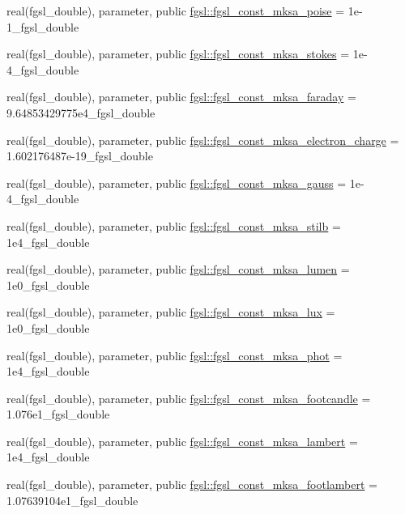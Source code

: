 \begin{DoxyCompactItemize}
\item 
real(fgsl\+\_\+double), parameter, public \hyperlink{namespacefgsl_a1b18b9e73da6e94185746f50a31ca4c3}{fgsl\+::fgsl\+\_\+const\+\_\+mksa\+\_\+poise} = 1e-\/1\+\_\+fgsl\+\_\+double
\item 
real(fgsl\+\_\+double), parameter, public \hyperlink{namespacefgsl_a273648685fb01a8fa87760688d2be8aa}{fgsl\+::fgsl\+\_\+const\+\_\+mksa\+\_\+stokes} = 1e-\/4\+\_\+fgsl\+\_\+double
\item 
real(fgsl\+\_\+double), parameter, public \hyperlink{namespacefgsl_a7a5c5ad37eb790e7372f127324e5fc9f}{fgsl\+::fgsl\+\_\+const\+\_\+mksa\+\_\+faraday} = 9.\+64853429775e4\+\_\+fgsl\+\_\+double
\item 
real(fgsl\+\_\+double), parameter, public \hyperlink{namespacefgsl_a5e5f274ebbe5764c7828f792b8b10b12}{fgsl\+::fgsl\+\_\+const\+\_\+mksa\+\_\+electron\+\_\+charge} = 1.\+602176487e-\/19\+\_\+fgsl\+\_\+double
\item 
real(fgsl\+\_\+double), parameter, public \hyperlink{namespacefgsl_a043539089f28355888955c6546349052}{fgsl\+::fgsl\+\_\+const\+\_\+mksa\+\_\+gauss} = 1e-\/4\+\_\+fgsl\+\_\+double
\item 
real(fgsl\+\_\+double), parameter, public \hyperlink{namespacefgsl_a744ee71f71c6df7add4526f13316e982}{fgsl\+::fgsl\+\_\+const\+\_\+mksa\+\_\+stilb} = 1e4\+\_\+fgsl\+\_\+double
\item 
real(fgsl\+\_\+double), parameter, public \hyperlink{namespacefgsl_a7bb4dd075b4ec4613ff976153a8a42dd}{fgsl\+::fgsl\+\_\+const\+\_\+mksa\+\_\+lumen} = 1e0\+\_\+fgsl\+\_\+double
\item 
real(fgsl\+\_\+double), parameter, public \hyperlink{namespacefgsl_a38e1e1db82aff58851133f55d981feed}{fgsl\+::fgsl\+\_\+const\+\_\+mksa\+\_\+lux} = 1e0\+\_\+fgsl\+\_\+double
\item 
real(fgsl\+\_\+double), parameter, public \hyperlink{namespacefgsl_aa7384fc174d5954073075ac6e8117789}{fgsl\+::fgsl\+\_\+const\+\_\+mksa\+\_\+phot} = 1e4\+\_\+fgsl\+\_\+double
\item 
real(fgsl\+\_\+double), parameter, public \hyperlink{namespacefgsl_aed42c585eae8fbc1ddd6baf9d539408f}{fgsl\+::fgsl\+\_\+const\+\_\+mksa\+\_\+footcandle} = 1.\+076e1\+\_\+fgsl\+\_\+double
\item 
real(fgsl\+\_\+double), parameter, public \hyperlink{namespacefgsl_abb530767690eea1cf7e8d6d99141ae41}{fgsl\+::fgsl\+\_\+const\+\_\+mksa\+\_\+lambert} = 1e4\+\_\+fgsl\+\_\+double
\item 
real(fgsl\+\_\+double), parameter, public \hyperlink{namespacefgsl_a5362c5c67d790eba885afc839e76df4a}{fgsl\+::fgsl\+\_\+const\+\_\+mksa\+\_\+footlambert} = 1.\+07639104e1\+\_\+fgsl\+\_\+double

\end{DoxyCompactItemize}
